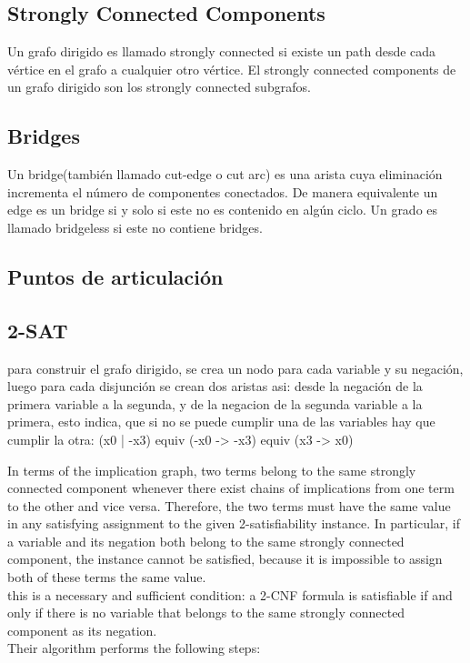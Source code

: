 \documentclass[10pt,letterpaper,twocolumn,twosided]{article}
\newcommand{\codigofuente}[1]{

\dotfill
}
\begin{document}
\codigofuente{src/graphs/prim.cpp}

\subsection{Strongly Connected Components}
Un grafo dirigido es llamado strongly connected si existe un path desde cada vértice en el grafo a cualquier otro vértice. El strongly connected components de un grafo dirigido son los strongly connected subgrafos.

\codigofuente{src/graphs/tarjan.cpp}

\subsection{Bridges}
Un bridge(también llamado cut-edge o cut arc) es una arista cuya eliminación incrementa el número de componentes conectados. De manera equivalente un edge es un bridge si y solo si este no es contenido en algún ciclo. Un grado es llamado bridgeless si este no contiene bridges.
\codigofuente{src/graphs/bridges.cpp}

\subsection{Puntos de articulación}

\codigofuente{src/graphs/puntos_articulacion.cpp}

\subsection{2-SAT}
para construir el grafo dirigido, se crea un nodo para cada variable y su negación, luego para cada disjunción se crean dos aristas asi:  desde la negación de la primera variable a la segunda, y de la negacion de la segunda variable a la primera, esto indica, que si no se puede cumplir una de las variables hay que cumplir la otra:
    (x0 | -x3) equiv (-x0 -> -x3) equiv (x3 -> x0)


In terms of the implication graph, two terms belong to the same strongly connected component whenever there exist chains of implications from one term to the other and vice versa. Therefore, the two terms must have the same value in any satisfying assignment to the given 2-satisfiability instance. In particular, if a variable and its negation both belong to the same strongly connected component, the instance cannot be satisfied, because it is impossible to assign both of these terms the same value.
\\
this is a necessary and sufficient condition: a 2-CNF formula is satisfiable if and only if there is no variable that belongs to the same strongly connected component as its negation.
\\
Their algorithm performs the following steps:
\end{document}
